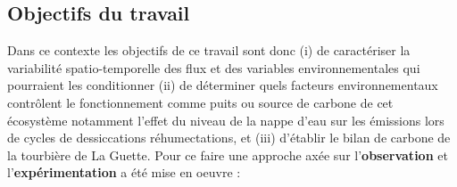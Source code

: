 

\subsection*{Objectifs du travail}
Dans ce contexte les objectifs de ce travail sont donc (i) de caractériser la variabilité spatio-temporelle des flux et des variables environnementales qui pourraient les conditionner (ii) de déterminer quels facteurs environnementaux contrôlent le fonctionnement comme puits ou source de carbone de cet écosystème notamment l'effet du niveau de la nappe d'eau sur les émissions lors de cycles de dessiccations réhumectations, et (iii) d'établir le bilan de carbone de la tourbière de La Guette.
Pour ce faire une approche axée sur l'\textbf{observation} et l'\textbf{expérimentation} a été mise en oeuvre : 

%


